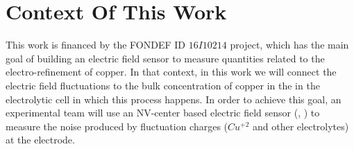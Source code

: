 \section{Context Of This Work}
\label{sec:context}
This work is financed by the FONDEF ID $16I10214$ project, which has the main goal of building an electric field sensor to measure quantities related to the electro-refinement of copper. In that context, in this work we will connect the electric field fluctuations to the bulk concentration of copper in the in the electrolytic cell in which this process happens. In order to achieve this goal, an experimental team will use an NV-center based electric field sensor (\cite{Dolde2011}, \cite{NatureMaze}) to measure the noise produced by fluctuation charges ($Cu^{+2}$ and other electrolytes) at the electrode.
